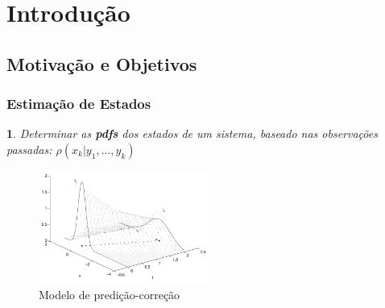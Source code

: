 \documentclass{beamer}
\renewcommand{\(}{\left(}
\renewcommand{\)}{\right)}
\renewcommand{\[}{\left[}
\renewcommand{\]}{\right]}
\newtheorem{definicao}{}
\begin{document}

\section{Introdução} 

\subsection{Motivação e Objetivos} 


\begin{frame}
	\frametitle{Estimação de Estados}
	\begin{definicao}
		Determinar as \textbf{pdfs} dos estados de um sistema, baseado nas observações passadas: $\rho(x_k | y_1,...,y_k)$ \\
	\end{definicao}
	
	\begin{figure}
		\centering
		\caption{Modelo de predição-correção}
		\includegraphics[width=0.5\textwidth]{images/pdf-propagacao.png}
	\end{figure}

\end{frame}

\end{document}

